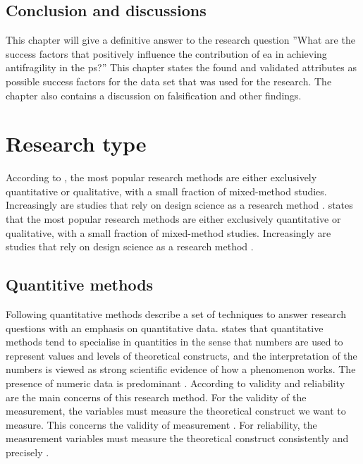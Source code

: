 \subsection{Conclusion and discussions}
\label{sub:conclusionanddiscussions}
This chapter will give a definitive answer to the research question ''What are the success factors that positively influence the contribution of \acrlong{ea} in achieving \gls{antifragility} in the \gls{ps}?'' This chapter states the found and validated attributes as possible success factors for the data set that was used for the research. The chapter also contains a discussion on falsification and other findings.

\section{Research type}
\label{sec:researchtype}
According to \textcite[p.~62]{Recker2013}, the most popular research methods are either exclusively quantitative or qualitative, with a small fraction of mixed-method studies. Increasingly are studies that rely on design science as a research method \parencite[p.~62]{Recker2013}. \textcite[p.~62]{Recker2013} states that the most popular research methods are either exclusively quantitative or qualitative, with a small fraction of mixed-method studies. Increasingly are studies that rely on design science as a research method \parencite[p.~62]{Recker2013}.

\subsection{Quantitive methods}
\label{sub:quantitivemethods}
Following \textcite[p.~62]{Recker2013} quantitative methods describe a set of techniques to answer research questions with an emphasis on quantitative data. \textcite[p.~63]{Recker2013} states that quantitative methods tend to specialise in quantities in the sense that numbers are used to represent values and levels of theoretical constructs, and the interpretation of the numbers is viewed as strong scientific evidence of how a phenomenon works. The presence of numeric data is predominant \parencite[p.~62]{Recker2013}. According to \textcite[p.~64]{Recker2013} validity and reliability are the main concerns of this research method. For the validity of the measurement, the variables must measure the theoretical construct we want to measure. This concerns the validity of measurement \parencite[p.~64]{Recker2013}. For reliability, the measurement variables must measure the theoretical construct consistently and precisely \parencite[p.~64--65]{Recker2013}.

